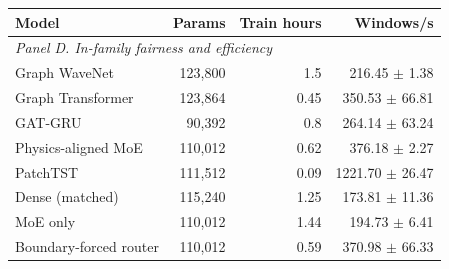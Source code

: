\begin{table}[t]
\vspace{0.25em}
\begin{tabular}{lrrr}
\toprule
Model & Params & Train hours & Windows/s \\
\midrule
\multicolumn{4}{l}{\textit{Panel D. In-family fairness and efficiency}} \\
Graph WaveNet & 123,800 & 1.5 & 216.45 $\pm$ 1.38 \\
Graph Transformer & 123,864 & 0.45 & 350.53 $\pm$ 66.81 \\
GAT-GRU & 90,392 & 0.8 & 264.14 $\pm$ 63.24 \\
Physics-aligned MoE & 110,012 & 0.62 & 376.18 $\pm$ 2.27 \\
PatchTST & 111,512 & 0.09 & 1221.70 $\pm$ 26.47 \\
Dense (matched) & 115,240 & 1.25 & 173.81 $\pm$ 11.36 \\
MoE only & 110,012 & 1.44 & 194.73 $\pm$ 6.41 \\
Boundary-forced router & 110,012 & 0.59 & 370.98 $\pm$ 66.33 \\
\bottomrule
\end{tabular}
\end{table}
